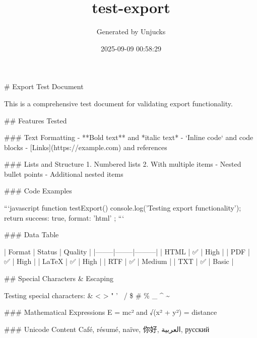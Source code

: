 \documentclass{article}
\title{test-export}
\author{Generated by Unjucks}
\date{2025-09-09 00:58:29}
\begin{document}
\maketitle



\# Export Test Document

This is a comprehensive test document for validating export functionality.

\#\# Features Tested

\#\#\# Text Formatting
- **Bold text** and *italic text*
- `Inline code` and code blocks
- [Links](https://example.com) and references

\#\#\# Lists and Structure
1. Numbered lists
2. With multiple items
   - Nested bullet points
   - Additional nested items

\#\#\# Code Examples

```javascript
function testExport() {
  console.log('Testing export functionality');
  return { success: true, format: 'html' };
}
```

\#\#\# Data Table

| Format | Status | Quality |
|--------|--------|---------|
| HTML   | ✅     | High    |
| PDF    | ✅     | High    |
| LaTeX  | ✅     | High    |
| RTF    | ✅     | Medium  |
| TXT    | ✅     | Basic   |

\#\# Special Characters \& Escaping

Testing special characters: \& < > " ' \ / \$ \# \% \_ \textasciicircum{} \textasciitilde{} 

\#\#\# Mathematical Expressions
E = mc² and √(x² + y²) = distance

\#\#\# Unicode Content
Café, résumé, naïve, 你好, العربية, русский
\end{document}
